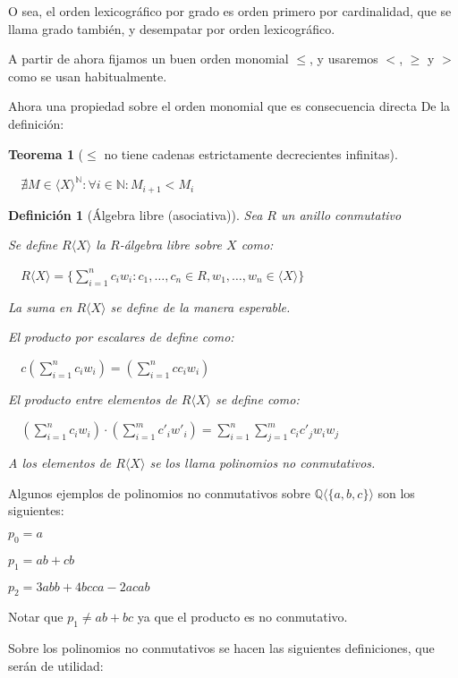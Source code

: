 \documentclass{amsbook}
\theoremstyle{customstyle}
\newtheorem{definition}{Definición}[section]
\newtheorem{theorem}{Teorema}[section]
\begin{document}
O sea, el orden lexicográfico por grado es orden primero por cardinalidad, que se llama grado también, y desempatar por orden lexicográfico.

A partir de ahora fijamos un buen orden monomial $≤$, y usaremos $<$, $≥$ y $>$ como se usan habitualmente.

Ahora una propiedad sobre el orden monomial que es consecuencia directa De la definición:

\begin{theorem}[$≤$ no tiene cadenas estrictamente decrecientes infinitas]\label{thm:< no cadenas dec inf}\

  $∄M ∈ ⟨X⟩^ℕ : ∀i ∈ ℕ : M_{i + 1} < M_i$

\end{theorem}

\begin{definition}[Álgebra libre (asociativa)]
Sea $R$ un anillo conmutativo

Se define $R⟨X⟩$ la $R$-álgebra libre sobre $X$ como:

  $R⟨X⟩ = \{\sum_{i = 1}^n c_i w_i : c_1, …, c_n ∈ R, w_1, …, w_n ∈ ⟨X⟩\}$

La suma en $R⟨X⟩$ se define de la manera esperable.

El producto por escalares de define como:

  $c (\sum_{i = 1}^n c_i w_i) = (\sum_{i = 1}^n c c_i w_i)$

El producto entre elementos de $R⟨X⟩$ se define como:

  $(\sum_{i = 1}^n c_i w_i) · (\sum_{i = 1}^m c'_i w'_i) = \sum_{i = 1}^n \sum_{j = 1}^m c_i c'_j w_i w_j$

A los elementos de $R⟨X⟩$ se los llama polinomios no conmutativos.
\end{definition}

Algunos ejemplos de polinomios no conmutativos sobre $ℚ⟨\{a, b, c\}⟩$ son los siguientes:

$p_0 = a$

$p_1 = ab + cb$

$p_2 = 3 abb + 4 bcca - 2 acab$

Notar que $p_1 ≠ ab + bc$ ya que el producto es no conmutativo.

Sobre los polinomios no conmutativos se hacen las siguientes definiciones, que serán de utilidad:
\end{document}
